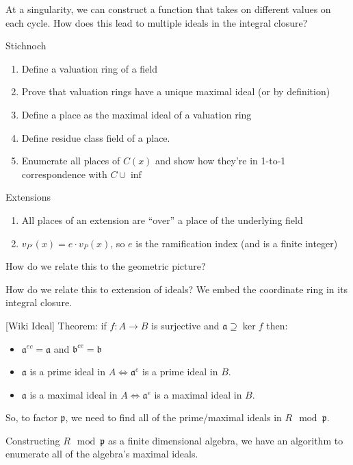 At a singularity, we can construct a function that takes on different values on each cycle.
How does this lead to multiple ideals in the integral closure?

Stichnoch

\begin{enumerate}
\item Define a valuation ring of a field
\item Prove that valuation rings have a unique maximal ideal (or by definition)
\item Define a place as the maximal ideal of a valuation ring
\item Define residue class field of a place.
\item Enumerate all places of $C(x)$ and show how they're in 1-to-1 correspondence with $C \cup \inf$
\end{enumerate}

Extensions

\begin{enumerate}
\item All places of an extension are ``over'' a place of the underlying field
\item $v_{P'}(x) = e\cdot v_P(x)$, so $e$ is the ramification index (and is a finite integer)
\end{enumerate}

How do we relate this to the geometric picture?

How do we relate this to extension of ideals?  We embed the coordinate ring in its integral closure.

[Wiki Ideal] Theorem: if $f: A \to B$ is surjective and $ \mathfrak {a}\supseteq \ker f$ then:

\begin{itemize}
\item $\mathfrak {a}^{ec}={\mathfrak {a}}$ and ${\mathfrak {b}}^{ce}={\mathfrak {b}}$
\item ${\mathfrak {a}}$ is a prime ideal in $A \Leftrightarrow {\mathfrak  {a}}^{e}$ is a prime ideal in $B$.
\item ${\mathfrak {a}}$ is a maximal ideal in $A \Leftrightarrow  {\mathfrak  {a}}^{e}$ is a maximal ideal in $B$.
\end{itemize}

So, to factor $\mathfrak{p}$, we need to find all of the prime/maximal ideals
in $R \mod \mathfrak{p}$.

Constructing $R \mod \mathfrak{p}$ as a finite dimensional algebra,
we have an algorithm to enumerate all of the algebra's maximal ideals.

